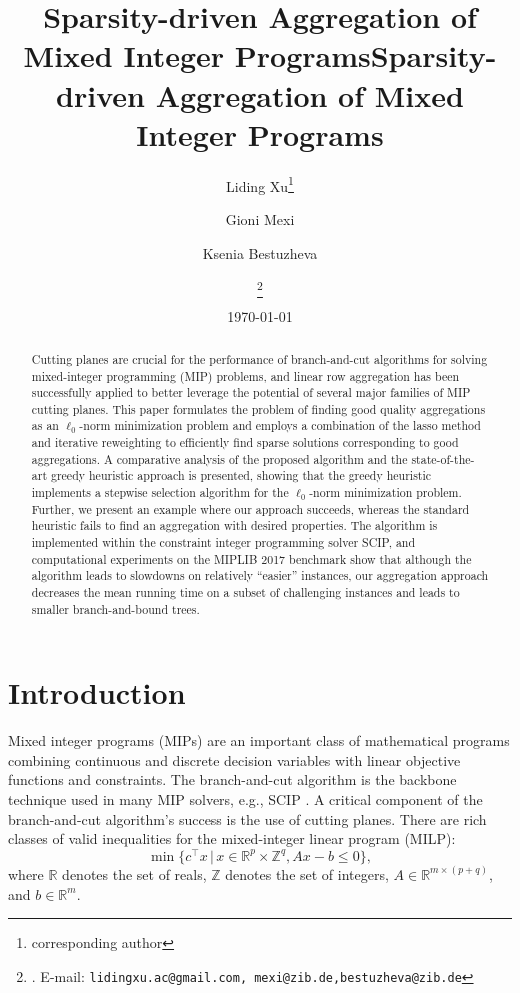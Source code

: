 \documentclass[a4paper,UKenglish,cleveref, autoref,  thm-restate]{lipics-v2021}
\title{Sparsity-driven Aggregation of Mixed Integer Programs} %
\author{Liding Xu\footnote{corresponding author}}{Zuse Institute Berlin, Germany}{lidingxu.ac@gmail.com}{https://orcid.org/0000-0002-0286-1109}{}
\author{Gioni Mexi}{Zuse Institute Berlin, Germany}{mexi@zib.de}{https://orcid.org/0000-0003-0964-9802}{}
\author{Ksenia Bestuzheva}{Zuse Institute Berlin, Germany}{bestuzheva@zib.de}{https://orcid.org/0000-0002-7018-7099}{}
\title{Sparsity-driven Aggregation of Mixed Integer Programs}
\date{\today}
\author{\fnm{Liding} \sur{Xu} \thanks{  \orgname{Zuse Institute Berlin, Germany}.
			E-mail: {\tt lidingxu.ac@gmail.com, mexi@zib.de,bestuzheva@zib.de}}
		\and
		\fnm{Gioni} \sur{Mexi} \footnotemark[1]
		\and
		\fnm{Ksenia} \sur{Bestuzheva} \footnotemark[1]
	}
\newcommand{\bR}{\mathbb{R}}
\newcommand{\bZ}{\mathbb{Z}}
\begin{document}
	
	\maketitle
	
	
	\begin{abstract}
		Cutting planes are crucial for the performance of branch-and-cut algorithms for solving mixed-integer programming (MIP) problems, and linear row aggregation has been successfully applied to better leverage the potential of several major families of MIP cutting planes. This paper formulates the problem of finding good quality aggregations as an $\ell_0$-norm minimization problem and employs a combination of the lasso method and iterative reweighting to efficiently find sparse solutions corresponding to good aggregations. A comparative analysis of the proposed algorithm and the state-of-the-art greedy heuristic approach is presented, showing that the greedy heuristic implements a stepwise selection algorithm for the $\ell_0$-norm minimization problem. Further, we present an example where our approach succeeds, whereas the standard heuristic fails to find an aggregation with desired properties. The algorithm is implemented within the constraint integer programming solver SCIP, and computational experiments on the MIPLIB 2017 benchmark show that although the algorithm leads to slowdowns on relatively ``easier'' instances, our aggregation approach decreases the mean running time on a subset of challenging instances and leads to smaller branch-and-bound trees.
	\end{abstract}
	
	
	
	
	\section{Introduction}
	Mixed integer programs (MIPs) are an important class of mathematical programs combining continuous and discrete decision variables with linear objective functions and constraints.
	The branch-and-cut algorithm is the backbone technique used in many MIP solvers, e.g., SCIP \cite{bolusani2024scipoptimizationsuite90}.
	A critical component of the branch-and-cut algorithm's success is the use of cutting planes.
	There are rich classes of valid inequalities for the mixed-integer linear program (MILP):
	\begin{equation}
		\label{eq.milp}
		\min \{c^\top x \,|\, x  \in \bR^p \times \bZ^{q}, Ax - b \le 0\},
	\end{equation}
	where $\bR$ denotes the set of reals,  $\bZ$ denotes the set  of integers, $A \in \bR^{m \times (p+q)}$, and $b \in \bR^m$.
	
\end{document}
